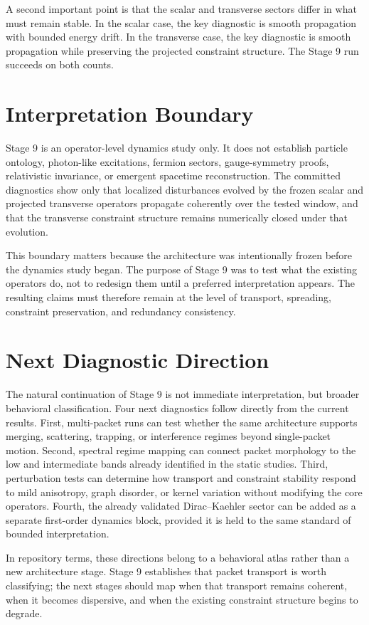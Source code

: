 \documentclass[11pt]{article}
\begin{document}
A second important point is that the scalar and transverse sectors differ in what must remain stable. In the scalar case, the key diagnostic is smooth propagation with bounded energy drift. In the transverse case, the key diagnostic is smooth propagation while preserving the projected constraint structure. The Stage 9 run succeeds on both counts.

\section{Interpretation Boundary}
Stage 9 is an operator-level dynamics study only. It does not establish particle ontology, photon-like excitations, fermion sectors, gauge-symmetry proofs, relativistic invariance, or emergent spacetime reconstruction. The committed diagnostics show only that localized disturbances evolved by the frozen scalar and projected transverse operators propagate coherently over the tested window, and that the transverse constraint structure remains numerically closed under that evolution.

This boundary matters because the architecture was intentionally frozen before the dynamics study began. The purpose of Stage 9 was to test what the existing operators do, not to redesign them until a preferred interpretation appears. The resulting claims must therefore remain at the level of transport, spreading, constraint preservation, and redundancy consistency.

\section{Next Diagnostic Direction}
The natural continuation of Stage 9 is not immediate interpretation, but broader behavioral classification. Four next diagnostics follow directly from the current results. First, multi-packet runs can test whether the same architecture supports merging, scattering, trapping, or interference regimes beyond single-packet motion. Second, spectral regime mapping can connect packet morphology to the low and intermediate bands already identified in the static studies. Third, perturbation tests can determine how transport and constraint stability respond to mild anisotropy, graph disorder, or kernel variation without modifying the core operators. Fourth, the already validated Dirac--Kaehler sector can be added as a separate first-order dynamics block, provided it is held to the same standard of bounded interpretation.

In repository terms, these directions belong to a behavioral atlas rather than a new architecture stage. Stage 9 establishes that packet transport is worth classifying; the next stages should map when that transport remains coherent, when it becomes dispersive, and when the existing constraint structure begins to degrade.
\end{document}
